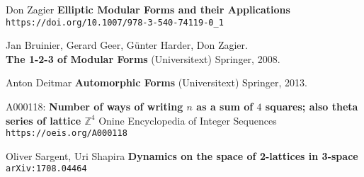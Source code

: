 \documentclass[12pt]{article}
\begin{document}
\vfill

\begin{thebibliography}{}


\item Don Zagier \textbf{Elliptic Modular Forms and their Applications} \\ \texttt{https://doi.org/10.1007/978-3-540-74119-0\_1}

\item Jan Bruinier, Gerard Geer, G\"{u}nter Harder, Don Zagier. \\ \textbf{The 1-2-3 of Modular Forms} (Universitext) Springer, 2008.

\item Anton Deitmar \textbf{Automorphic Forms} (Universitext) Springer, 2013.

\item A000118:\textbf{	Number of ways of writing $n$ as a sum of $4$ squares; also theta series of lattice $\mathbb{Z}^4$} Onine Encyclopedia of Integer Sequences \texttt{https://oeis.org/A000118}

\item Oliver Sargent, Uri Shapira \textbf{Dynamics on the space of 2-lattices in 3-space} \texttt{arXiv:1708.04464}

\end{thebibliography}

\newpage
\end{document}
